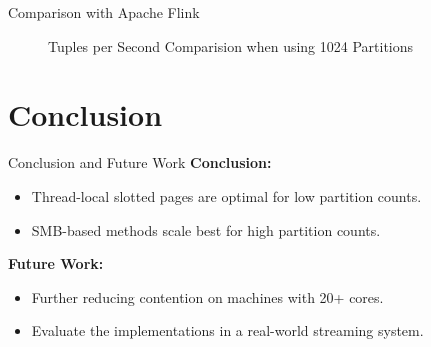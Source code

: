 \begin{frame}{Comparison with Apache Flink}
  \begin{figure}[h]
    \centering
    \resizebox{.7\linewidth}{!}{}
    \caption[Tuples per Second Comparison Plot with Apache Flink]{Tuples per Second Comparision when using 1024 Partitions}
    \label{plot-apache-flink-comparison}
  \end{figure}
\end{frame}

\section{Conclusion}
\begin{frame}{Conclusion and Future Work}
  \textbf{Conclusion:}

  \begin{itemize}
    \item Thread-local slotted pages are optimal for low partition counts.
    \item SMB-based methods scale best for high partition counts.
  \end{itemize}

  \textbf{Future Work:}
  \begin{itemize}
    \item Further reducing contention on machines with 20+ cores.
    \item Evaluate the implementations in a real-world streaming system.
  \end{itemize}

\end{frame}


